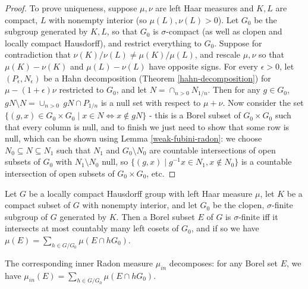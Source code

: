 \begin{proof}

To prove uniqueness, suppose $\mu, \nu$ are left Haar measures and $K,L$ are compact, $L$ with nonempty interior (so $\mu(L), \nu(L) > 0$). Let $G_0$ be the subgroup generated by $K, L$, so that $G_0$ is $\sigma$-compact (as well as clopen and locally compact Hausdorff), and restrict everything to $G_0$. Suppose for contradiction that $\nu(K)/\nu(L) \ne \mu(K)/\mu(L)$, and rescale $\mu,\nu$ so that $\mu(K) - \nu(K)$ and $\mu(L) - \nu(L)$ have opposite signs. For every $\epsilon > 0$, let $(P_\epsilon,N_\epsilon)$ be a Hahn decomposition (Theorem \ref{hahn-decomposition}) for $\mu-(1+\epsilon)\nu$ restricted to $G_0$, and let $N = \cap_{n > 0} N_{1/n}$. Then for any $g \in G_0$, $gN\setminus N = \cup_{n > 0}\ gN\cap P_{1/n}$ is a null set with respect to $\mu+\nu$. Now consider the set $\{(g,x) \in G_0\times G_0 \mid x \in N \iff x \not\in gN\}$ - this is a Borel subset of $G_0 \times G_0$ such that every column is null, and to finish we just need to show that some row is null, which can be shown using Lemma \ref{weak-fubini-radon}: we choose $N_0 \subseteq N \subseteq N_1$ such that $N_1$ and $G_0 \setminus N_0$ are countable intersections of open subsets of $G_0$ with $N_1\setminus N_0$ null, so $\{(g,x) \mid g^{-1}x \in N_1, x \not\in N_0\}$ is a countable intersection of open subsets of $G_0 \times G_0$, etc.
\end{proof}

\begin{prop} Let $G$ be a locally compact Hausdorff group with left Haar measure $\mu$, let $K$ be a compact subset of $G$ with nonempty interior, and let $G_0$ be the clopen, $\sigma$-finite subgroup of $G$ generated by $K$. Then a Borel subset $E$ of $G$ is $\sigma$-finite iff it intersects at most countably many left cosets of $G_0$, and if so we have $\mu(E) = \sum_{h \in G/G_0} \mu(E\cap hG_0)$.

The corresponding inner Radon measure $\mu_{in}$ decomposes: for any Borel set $E$, we have $\mu_{in}(E) = \sum_{h \in G/G_0} \mu(E\cap hG_0)$.
\end{prop}

